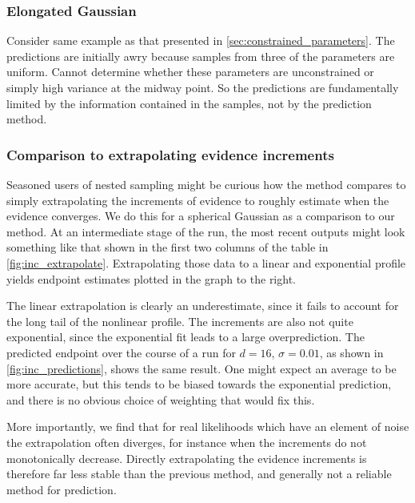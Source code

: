 \documentclass[usenatbib]{mnras}
\begin{document}
\subsubsection{Elongated Gaussian}
Consider same example as that presented in \cref{sec:constrained_parameters}. The predictions are initially awry because samples from three of the parameters are uniform. Cannot determine whether these parameters are unconstrained or simply high variance at the midway point. So the predictions are fundamentally limited by the information contained in the samples, not by the prediction method.  

\subsubsection*{Comparison to extrapolating evidence increments}
Seasoned users of nested sampling might be curious how the method compares to simply extrapolating the increments of evidence to roughly estimate when the evidence converges. We do this for a spherical Gaussian as a comparison to our method. At an intermediate stage of the run, the most recent outputs might look something like that shown in the first two columns of the table in \cref{fig:inc_extrapolate}. Extrapolating those data to a linear and exponential profile yields endpoint estimates plotted in the graph to the right. 
\par
The linear extrapolation is clearly an underestimate, since it fails to account for the long tail of the nonlinear profile. The increments are also not quite exponential, since the exponential fit leads to a large overprediction. The predicted endpoint over the course of a run for $d = 16$, $\sigma = 0.01$, as shown in \cref{fig:inc_predictions}, shows the same result. One might expect an average to be more accurate, but this tends to be biased towards the exponential prediction, and there is no obvious choice of weighting that would fix this.
\par
More importantly, we find that for real likelihoods which have an element of noise the extrapolation often diverges, for instance when the increments do not monotonically decrease. Directly extrapolating the evidence increments is therefore far less stable than the previous method, and generally not a reliable method for prediction.
\end{document}
